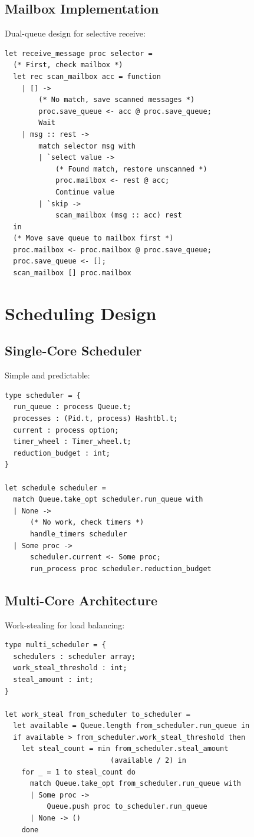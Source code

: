 \documentclass[12pt,a4paper]{report}
\begin{document}
\subsection{Mailbox Implementation}

Dual-queue design for selective receive:

\begin{lstlisting}
let receive_message proc selector =
  (* First, check mailbox *)
  let rec scan_mailbox acc = function
    | [] -> 
        (* No match, save scanned messages *)
        proc.save_queue <- acc @ proc.save_queue;
        Wait
    | msg :: rest ->
        match selector msg with
        | `select value ->
            (* Found match, restore unscanned *)
            proc.mailbox <- rest @ acc;
            Continue value
        | `skip ->
            scan_mailbox (msg :: acc) rest
  in
  (* Move save queue to mailbox first *)
  proc.mailbox <- proc.mailbox @ proc.save_queue;
  proc.save_queue <- [];
  scan_mailbox [] proc.mailbox
\end{lstlisting}

\section{Scheduling Design}

\subsection{Single-Core Scheduler}

Simple and predictable:

\begin{lstlisting}
type scheduler = {
  run_queue : process Queue.t;
  processes : (Pid.t, process) Hashtbl.t;
  current : process option;
  timer_wheel : Timer_wheel.t;
  reduction_budget : int;
}

let schedule scheduler =
  match Queue.take_opt scheduler.run_queue with
  | None -> 
      (* No work, check timers *)
      handle_timers scheduler
  | Some proc ->
      scheduler.current <- Some proc;
      run_process proc scheduler.reduction_budget
\end{lstlisting}

\subsection{Multi-Core Architecture}

Work-stealing for load balancing:

\begin{lstlisting}
type multi_scheduler = {
  schedulers : scheduler array;
  work_steal_threshold : int;
  steal_amount : int;
}

let work_steal from_scheduler to_scheduler =
  let available = Queue.length from_scheduler.run_queue in
  if available > from_scheduler.work_steal_threshold then
    let steal_count = min from_scheduler.steal_amount 
                         (available / 2) in
    for _ = 1 to steal_count do
      match Queue.take_opt from_scheduler.run_queue with
      | Some proc -> 
          Queue.push proc to_scheduler.run_queue
      | None -> ()
    done
\end{lstlisting}
\end{document}
